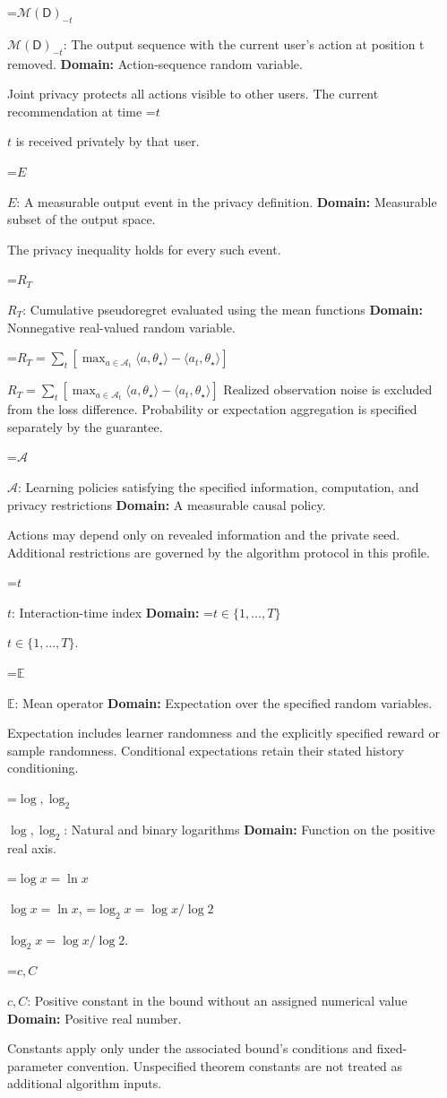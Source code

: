 \documentclass[10pt,a4paper]{article}
\newcommand{\AtlasMath}[1]{\par\begingroup\centering\setbox0=\hbox{$\displaystyle #1$}\ifdim\wd0>1.4\linewidth\typeout{ATLAS WIDE FORMULA: \the\wd0}\fi\ifdim\wd0>\linewidth\resizebox{\linewidth}{!}{\box0}\else\box0\fi\par\endgroup}
\newcommand{\AtlasInlineMath}[1]{\begingroup\setbox0=\hbox{$#1$}\ifdim\wd0>.4\linewidth\endgroup\AtlasMath{#1}\else\endgroup$#1$\fi}
\begin{document}
\AtlasInlineMath{\mathcal M(\mathsf D)_{-t}}: The output sequence with the current user’s action at position t removed. \textbf{Domain:} Action-sequence random variable.

Joint privacy protects all actions visible to other users. The current recommendation at time \AtlasInlineMath{t} is received privately by that user.

\AtlasInlineMath{E}: A measurable output event in the privacy definition. \textbf{Domain:} Measurable subset of the output space.

The privacy inequality holds for every such event.

\AtlasInlineMath{R_T}: Cumulative pseudoregret evaluated using the mean functions \textbf{Domain:} Nonnegative real-valued random variable.

\AtlasInlineMath{R_T=\sum_t[\max_{a\in\mathcal A_t}\langle a,\theta_\star\rangle-\langle a_t,\theta_\star\rangle]} Realized observation noise is excluded from the loss difference. Probability or expectation aggregation is specified separately by the guarantee.

\AtlasInlineMath{\mathcal A}: Learning policies satisfying the specified information, computation, and privacy restrictions \textbf{Domain:} A measurable causal policy.

Actions may depend only on revealed information and the private seed. Additional restrictions are governed by the algorithm protocol in this profile.

\AtlasInlineMath{t}: Interaction-time index \textbf{Domain:} \AtlasInlineMath{t\in\{1,\ldots,T\}}.

\AtlasInlineMath{\mathbb E}: Mean operator \textbf{Domain:} Expectation over the specified random variables.

Expectation includes learner randomness and the explicitly specified reward or sample randomness. Conditional expectations retain their stated history conditioning.

\AtlasInlineMath{\log,\log_2}: Natural and binary logarithms \textbf{Domain:} Function on the positive real axis.

\AtlasInlineMath{\log x=\ln x}, \AtlasInlineMath{\log_2x=\log x/\log2}.

\AtlasInlineMath{c,C}: Positive constant in the bound without an assigned numerical value \textbf{Domain:} Positive real number.

Constants apply only under the associated bound’s conditions and fixed-parameter convention. Unspecified theorem constants are not treated as additional algorithm inputs.
\end{document}
